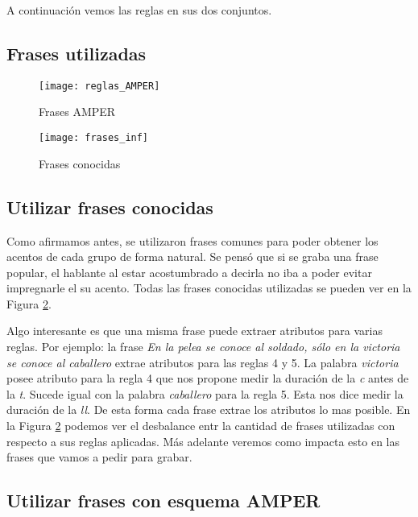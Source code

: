 A continuación vemos las reglas en sus dos conjuntos.

\subsection{Frases utilizadas}

\begin{figure}[h!]
    \centerline{\texttt{[image: reglas\_AMPER]} }
    \caption{Frases AMPER}
    \label{fig21}
\end{figure}

\begin{figure}[h!]
    \centerline{\texttt{[image: frases\_inf]} }
    \caption{Frases conocidas}
    \label{fig22}
\end{figure}

\subsection{Utilizar frases conocidas}

Como afirmamos antes, se utilizaron frases comunes para poder obtener los acentos de cada grupo de forma natural. Se pensó que si se graba una frase popular, el hablante al estar acostumbrado a decirla no iba a poder evitar impregnarle el su acento. Todas las frases conocidas utilizadas se pueden ver en la Figura \ref{fig22}.

Algo interesante es que una misma frase puede extraer atributos para varias reglas. Por ejemplo: la frase \textit{En la pelea se conoce al soldado, sólo en la victoria se conoce al caballero} extrae atributos para las reglas 4 y 5. La palabra \textit{victoria} posee atributo para la regla 4 que nos propone medir la duración de la \textit{c} antes de la \textit{t}. Sucede igual con la palabra \textit{caballero} para la regla 5. Esta nos dice medir la duración de la \textit{ll}. De esta forma cada frase extrae los atributos lo mas posible. En la Figura \ref{fig22} podemos ver el desbalance entr la cantidad de frases utilizadas con respecto a sus reglas aplicadas. Más adelante veremos como impacta esto en las frases que vamos a pedir para grabar.

\subsection{Utilizar frases con esquema AMPER}


